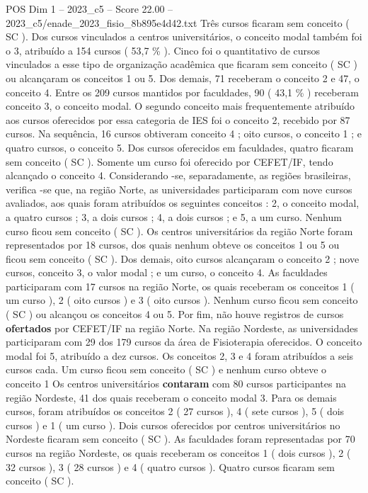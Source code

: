 \begin{textsample}{POS Dim 1 – 2023\_c5 – Score 22.00 – 2023\_c5/enade\_2023\_fisio\_8b895e4d42.txt}
Três cursos ficaram sem conceito ( SC ).
Dos cursos vinculados a centros universitários, o conceito modal também foi o 3, atribuído a 154 cursos ( 53,7 \% ).
Cinco foi o quantitativo de cursos vinculados a esse tipo de organização acadêmica que ficaram sem conceito ( SC ) ou alcançaram os conceitos 1 ou 5.
Dos demais, 71 receberam o conceito 2 e 47, o conceito 4.
Entre os 209 cursos mantidos por faculdades, 90 ( 43,1 \% ) receberam conceito 3, o conceito modal.
O segundo conceito mais frequentemente atribuído aos cursos oferecidos por essa categoria de IES foi o conceito 2, recebido por 87 cursos.
Na sequência, 16 cursos obtiveram conceito 4 ; oito cursos, o conceito 1 ; e quatro cursos, o conceito 5.
Dos cursos oferecidos em faculdades, quatro ficaram sem conceito ( SC ).
Somente um curso foi oferecido por CEFET/IF, tendo alcançado o conceito 4.
Considerando -se, separadamente, as regiões brasileiras, verifica -se que, na região Norte, as universidades participaram com nove cursos avaliados, aos quais foram atribuídos os seguintes conceitos : 2, o conceito modal, a quatro cursos ; 3, a dois cursos ; 4, a dois cursos ; e 5, a um curso.
Nenhum curso ficou sem conceito ( SC ).
Os centros universitários da região Norte foram representados por 18 cursos, dos quais nenhum obteve os conceitos 1 ou 5 ou ficou sem conceito ( SC ).
Dos demais, oito cursos alcançaram o conceito 2 ; nove cursos, conceito 3, o valor modal ; e um curso, o conceito 4.
As faculdades participaram com 17 cursos na região Norte, os quais receberam os conceitos 1 ( um curso ), 2 ( oito cursos ) e 3 ( oito cursos ).
Nenhum curso ficou sem conceito ( SC ) ou alcançou os conceitos 4 ou 5.
Por fim, não houve registros de cursos \textbf{ofertados} por CEFET/IF na região Norte.
Na região Nordeste, as universidades participaram com 29 dos 179 cursos da área de Fisioterapia oferecidos.
O conceito modal foi 5, atribuído a dez cursos.
Os conceitos 2, 3 e 4 foram atribuídos a seis cursos cada.
Um curso ficou sem conceito ( SC ) e nenhum curso obteve o conceito 1 Os centros universitários \textbf{contaram} com 80 cursos participantes na região Nordeste, 41 dos quais receberam o conceito modal 3.
Para os demais cursos, foram atribuídos os conceitos 2 ( 27 cursos ), 4 ( sete cursos ), 5 ( dois cursos ) e 1 ( um curso ).
Dois cursos oferecidos por centros universitários no Nordeste ficaram sem conceito ( SC ).
As faculdades foram representadas por 70 cursos na região Nordeste, os quais receberam os conceitos 1 ( dois cursos ), 2 ( 32 cursos ), 3 ( 28 cursos ) e 4 ( quatro cursos ).
Quatro cursos ficaram sem conceito ( SC ).

\end{textsample}
